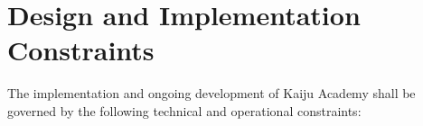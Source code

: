 \documentclass[a4paper, 11pt]{scrreprt}
\begin{document}
\section{Design and Implementation Constraints}

The implementation and ongoing development of Kaiju Academy shall be governed by the following technical and operational constraints:
\end{document}
